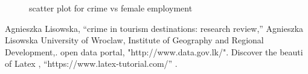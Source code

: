 \documentclass[conference]{IEEEtran}
\begin{document}
\begin{figure}[htbp]
  \centering
    \qquad
    \caption{scatter plot for crime vs female employment}
  \label{scatter2}
\end{figure}

\begin{thebibliography}{00}
 Agnieszka Lisowska, ``crime in tourism destinations: research review,'' Agnieszka Lisowska University of Wroclaw, Institute of Geography and Regional Development,.
 open data portal, "http://www.data.gov.lk/".
 Discover the beauti of Latex , ``https://www.latex-tutorial.com/'' .
\end{thebibliography}
\end{document}
